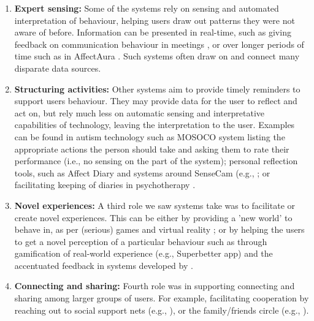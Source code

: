 \documentclass[prodmode,acmtochi]{acmsmall}
\newcommand{\todo}[1]{\textrm{\textrm{\textcolor{LightBlue}{[[#1]]} } } }
\newcommand{\GeraldineDIS}[1]{}
\newcommand{\rephrase}[1]{\textrm{\textrm{\textcolor{gray}{#1}}}}
\begin{document}
        \begin{enumerate}
                \item {\bf Expert sensing:} Some of the systems rely on sensing and automated interpretation of behaviour, helping users draw out patterns they were not aware of before. Information can be presented in real-time, such as giving feedback on communication behaviour in meetings \cite{Kim2008,DiMicco2007}, or over longer periods of time such as in AffectAura \cite{McDuff2012}. Such systems often draw on and connect many disparate data sources. 
                


                \item {\bf Structuring activities:} Other systems aim to provide timely reminders to support users behaviour. They may provide data for the user to reflect and act on, but rely much less on automatic sensing and interpretative capabilities of technology, leaving the interpretation to the user. Examples can be found in autism technology such as MOSOCO system \cite{Escobedo2012} listing the appropriate actions the person should take and asking them to rate their performance (i.e., no sensing on the part of the system); personal reflection tools, such as Affect Diary \cite{Stahl2008} and systems around SenseCam (e.g., \cite{Fleck2009}; or facilitating keeping of diaries in psychotherapy \cite{Matthews2011}.  

                \item {\bf Novel experiences:} A third role we saw systems take was to facilitate or create novel experiences. This can be either by providing a 'new world' to behave in,  as per (serious) games \cite{Hailpern2011} and virtual reality \cite{Bouchard2012,Romano2005};  or by helping the users to get a novel perception of a particular behaviour such as through gamification of real-world experience (e.g., Superbetter app) and  the accentuated feedback in systems developed by . 

                \item {\bf Connecting and sharing:} Fourth role was in supporting connecting and sharing among larger groups of users. For example, facilitating cooperation by reaching out to social support nets (e.g., \cite{Newman2011}), or the family/friends circle (e.g., \cite{Hong2012,Munson2010}).


\GeraldineDIS{G: need to include displays/modalities or whatever here too?   P: It doesn't seem to fit for me here, but perhaps I just misunderstood. The rest of the section talks about {\bf what} the technology does (conceptually), while modalities/displays are rather about specific {\bf hows} to do thigs like this. As such, they then got grouped into the design challenges.}        
\end{enumerate}
\end{document}
